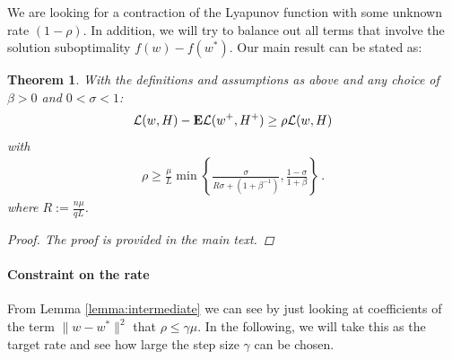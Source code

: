 \documentclass{article}
\newtheorem{theorem}{Theorem}
\newcommand{\E}{{\bf E}}
\begin{document}
We are looking for a contraction of the Lyapunov function with some unknown rate $(1-\rho)$.  In addition, we will try to balance out all terms that involve the solution suboptimality $f(w) - f(w^*)$.  Our main result can be stated as:
\begin{theorem}
\label{theorem:main}
With the definitions and assumptions as above and any choice of $\beta>0$ and $0 < \sigma <1$: 
\begin{align}
\L(w,H) - \E\L(w^+,H^+) \ge \rho \L(w,H)
\end{align}
with
\begin{align}
\rho \geq   
 \frac{\mu}{L} 
 \min \left\{  
  \frac{\sigma}{R \sigma + \left(1+\beta^{-1}\right)}, 
  \frac {1 - \sigma }{1+\beta}
\right\} \,.
\end{align}
where $R:=  \frac{n \mu}{qL}$.
\begin{proof}
The proof is provided in the main text.
\end{proof}
\end{theorem}

\paragraph{Constraint on the rate} From Lemma \ref{lemma:intermediate} we can see by just looking at coefficients of the term $\| w- w^*\|^2$ that $\rho \leq \gamma \mu$. In the following, we will take this as the target rate and see how large the step size $\gamma$ can be chosen.
\end{document}
